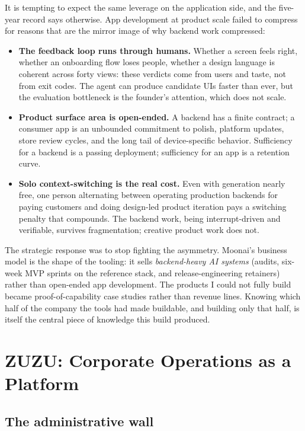 \documentclass{article}
\begin{document}
It is tempting to expect the same leverage on the application side, and the five-year record says otherwise. App development at product scale failed to compress for reasons that are the mirror image of why backend work compressed:

\begin{itemize}
    \item \textbf{The feedback loop runs through humans.} Whether a screen feels right, whether an onboarding flow loses people, whether a design language is coherent across forty views: these verdicts come from users and taste, not from exit codes. The agent can produce candidate UIs faster than ever, but the evaluation bottleneck is the founder's attention, which does not scale.
    \item \textbf{Product surface area is open-ended.} A backend has a finite contract; a consumer app is an unbounded commitment to polish, platform updates, store review cycles, and the long tail of device-specific behavior. Sufficiency for a backend is a passing deployment; sufficiency for an app is a retention curve.
    \item \textbf{Solo context-switching is the real cost.} Even with generation nearly free, one person alternating between operating production backends for paying customers and doing design-led product iteration pays a switching penalty that compounds. The backend work, being interrupt-driven and verifiable, survives fragmentation; creative product work does not.
\end{itemize}

The strategic response was to stop fighting the asymmetry. Moonai's business model is the shape of the tooling: it sells \emph{backend-heavy AI systems} (audits, six-week MVP sprints on the reference stack, and release-engineering retainers) rather than open-ended app development. The products I could not fully build became proof-of-capability case studies rather than revenue lines. Knowing which half of the company the tools had made buildable, and building only that half, is itself the central piece of knowledge this build produced.

\section{ZUZU: Corporate Operations as a Platform}

\subsection{The administrative wall}
\end{document}
